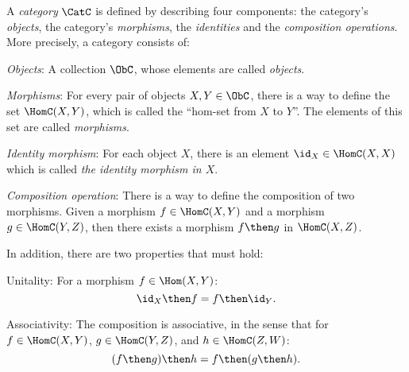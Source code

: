 \begin{shaded}
\begin{definition}[Category] \label{def:categorymain}
A \emph{category} $\CatC$ is defined by describing four components: the
category's \emph{objects}, the category's \emph{morphisms},
the \emph{identities} and the \emph{composition operations}. More precisely,
a category consists of:
\begin{compactenum}
\item \emph{Objects}: A collection $\ObC$, whose elements are called \emph{objects}.
\item \emph{Morphisms}: For every pair of objects $X, Y\in\ObC$, there is
a way to define the set $\HomC(X, Y)$, which is called the ``hom-set from
$X$ to $Y$''. The elements of this set are called \emph{morphisms}.
\item \emph{Identity morphism}:  For each object $X$, there is
an element $\id_X \in \HomC(X,X) $ which is called \emph{the identity
morphism in $X$}.
\item \emph{Composition operation}: There is a way to define the composition
of two morphisms. Given a morphism $f \in  \HomC(X,Y) $ and a morphism $g \in \HomC(Y, Z)$, then
there exists a morphism $f\then g$ in $\HomC(X, Z)$.

In addition, there are two properties that must hold:

\begin{compactenum}
    \item Unitality: For a morphism $f\in\Hom(X,Y)$: 
    \begin{equation}
        \id_X \then f=f \then \id_Y.
    \end{equation}
    \item Associativity: The composition is associative, in the sense that for $f\in \HomC(X,Y)$, $g\in \HomC(Y,Z)$, and $h\in \HomC(Z,W)$:
    \begin{equation}
        (f\then g)\then h= f \then (g \then h).
    \end{equation}
\end{compactenum}

\end{compactenum}
\end{definition}
\end{shaded}




